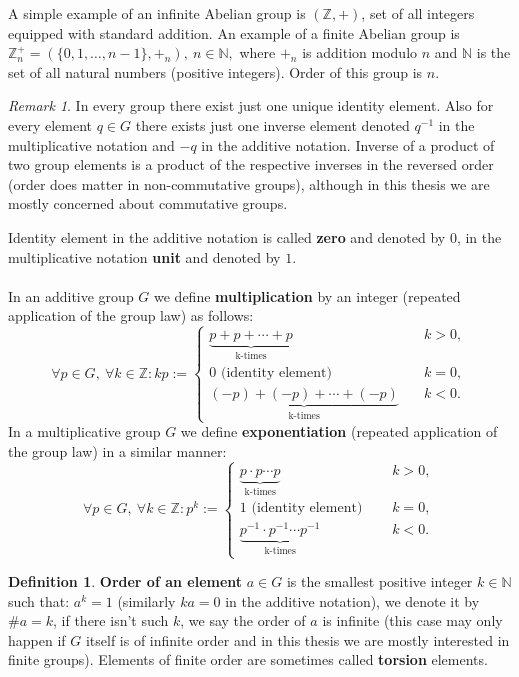 \documentclass[thesis=M,english]{FITthesis}[2012/10/20]
\theoremstyle{remark}
\newtheorem*{RM}{Remark}
\theoremstyle{definition}
\newtheorem{DF}{Definition}[section]
\begin{document}
\noindent A simple example of an infinite Abelian group is $(\mathbb{Z}, +)$, set of all integers equipped with standard addition. An example of a finite Abelian group is $\mathbb{Z}_n^+ = (\{0, 1, \ldots, n-1\}, +_{n}),\ n \in \mathbb{N},$ where $+_n$ is addition modulo $n$ and $\mathbb{N}$ is the set of all natural numbers (positive integers). Order of this group is $n$.
\begin{RM}
In every group there exist just one unique identity element. Also for every element $q \in G$ there exists just one inverse element denoted $q^{-1}$ in the multiplicative notation and $-q$ in the additive notation. Inverse of a product of two group elements is a product of the respective inverses in the reversed order (order does matter in non-commutative groups), although in this thesis we are mostly concerned about commutative groups.
\end{RM}
\noindent Identity element in the additive notation is called \textbf{zero} and denoted by $0$, in the multiplicative notation \textbf{unit} and denoted by $1$. \\ \\
In an additive group $G$ we define \textbf{multiplication} by an integer (repeated application of the group law) as follows:
$$
\forall p \in G,\ \forall k \in \mathbb{Z}: kp := \begin{cases} \underbrace{p + p + \cdots + p}_{\text{k-times}} &\quad k > 0, \\
0 \text{ (identity element) } &\quad k = 0, \\
\underbrace{(-p) + (-p) + \cdots + (-p)}_{\text{k-times}} &\quad k < 0.
\end{cases}
$$
In a multiplicative group $G$ we define \textbf{exponentiation} (repeated application of the group law) in a similar manner:
$$
\forall p \in G,\ \forall k \in \mathbb{Z}: p^k := \begin{cases} \underbrace{p \cdot p \cdots  p}_{\text{k-times}} &\quad k > 0, \\
1 \text{ (identity element) } &\quad k = 0, \\
\underbrace{p^{-1} \cdot p^{-1} \cdots  p^{-1}}_{\text{k-times}} &\quad k < 0.
\end{cases}
$$
\begin{DF}
\textbf{Order of an element} $a \in G$ is the smallest positive integer $k \in \mathbb{N}$ such that: $a^k = 1$ (similarly $ka = 0$ in the additive notation), we denote it by $\#a= k$, if there isn't such $k$, we say the order of $a$ is infinite (this case may only happen if $G$ itself is of infinite order and in this thesis we are mostly interested in finite groups). Elements of finite order are sometimes called \textbf{torsion} elements.
\end{DF}
\end{document}
